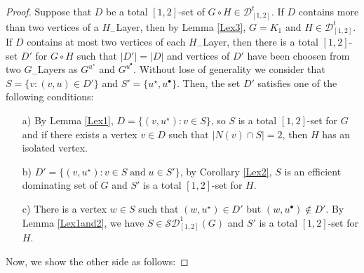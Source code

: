 \documentclass[A4,12pt]{article}
\theoremstyle{definition}
\theoremstyle{remark}
\begin{document}
\begin{proof}
	Suppose that $D$ be a total $[1,2]$-set of  $G \circ H \in \mathcal{D}^t_{[1,2]}$. If $D$ contains more than two vertices of a $H_{-}$Layer, then by Lemma \ref{Lex3}, $G=K_1$ and $H \in \mathcal{D}^t_{[1,2]}$.
	\\
	 If $D$ contains at most two vertices of each $H_{-}$Layer, then  there is a total $[1,2]$-set $D'$ for $G \circ H $ such that $\vert D' \vert=\vert D \vert$ and  vertices of $D'$ have  been choosen from two $G_{-}$Layers as $G^{u^{\star}}$ and $G^{u^{\bullet}}$. Without lose of generality we consider that $S=\{v: (v,u)\in D'\}$ and $S'=\{ u^{\star},u^{\bullet}\}$. Then, the set  $D'$ satisfies one of the following conditions:
\begin{enumerate}
\item [a)]
By Lemma \ref{Lex1}, $D=\{(v,u^{\star}):v\in S\}$, so $S$ is a total $[1,2]$-set for $G$ and if there exists a vertex $v\in D$ such that $\vert N(v) \cap S\vert =2$, then $H$ has an isolated vertex.
  \item [b)]
  $D'=\{(v,u^{\star}):v\in S\;\text{and}\;u\in S'\}$, by Corollary \ref{Lex2}, $S$ is an efficient dominating set of $G$ and $S'$ is  a total $[1,2]$-set for $H$.
  \item [c)]
  There is a vertex $w\in S$ such that $(w,u^{\star})\in D'$ but $(w,u^{\bullet})\notin D'$. By Lemma \ref{Lex1and2}, we have $S\in \mathcal{SD}^1_{[1,2]}(G)$ and $S'$ is  a total $[1,2]$-set for $H$.
\end{enumerate}

Now, we show the other side as follows:


\end{proof}
\end{document}
